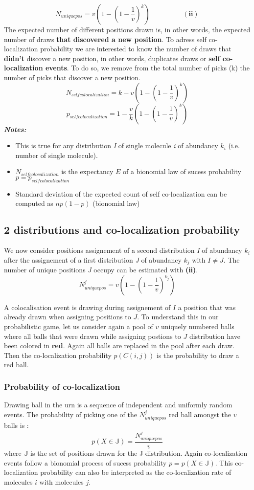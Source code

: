 \documentclass{article}  %
\begin{document}
\[
    N_{uniquepos} = v(1-(1-\frac{1}{v})^k) \hspace{2cm} (\textbf{ii})
\]
The expected number of different positions drawn is, in other words, the expected number of draws \textbf{that discovered a new position}.
To adress self co-localization probability we are interested to know the number of draws that \textbf{didn't} discover a new position,
in other words, duplicates draws or \textbf{self co-localization events}. To do so, we remove from the total number of picks (k) the
number of picks that discover a new position.
\[
N_{self colocalization} = k - v(1-(1-\frac{1}{v})^k)
\]
\[
p_{self colocalization} = 1 - \frac{v}{k}(1-(1-\frac{1}{v})^k)
\]
\textit{\textbf{Notes:}}
\begin{itemize}
    \item This is true for any distribution \textit{I} of single molecule \textit{i} of abundancy $ k_i $ (i.e. number of single molecule).
    \item $ N_{selfcolocalization} $ is the expectancy $E$ of a bionomial law of sucess probability $p = p_{selfcolocalization}$ 
    \item Standard deviation of the expected count of self co-localization can be computed as $ np(1-p) $ (bionomial law)
\end{itemize}


\subsection{2 distributions and co-localization probability}
We now consider positions assignement of a second distribution \textit{I} of abundancy $ k_i $ after the assignement of a first 
distribution \textit{J} of abundancy $ k_j $ with $ I \neq J $. The number of unique positions \textit{J} occupy can be estimated with
\textbf{(ii)}.
\[
N^j_{uniquepos} = v(1-(1-\frac{1}{v})^{k_j})
\]

A colocalisation event is drawing during assignement of $I$ a position that was already drawn when assigning positions to $J$. To
understand this in our probabilistic game, let us consider again a pool of $v$ uniquely numbered balls where all balls that were 
drawn while assigning postions to $J$ distribution have been colored in \textbf{red}. Again all balls are replaced in the pool after
each draw. Then the co-localization probability $p(C(i,j))$ is the
probability to draw a red ball.

\subsubsection{Probability of co-localization}
Drawing ball in the urn is a sequence of independent and uniformly random events. The probability of picking one of the $N^j_{uniquepos}$ red ball amongst the $v$
balls is :
\[
p(X\in \mathbb{J}) = \frac{N^j_{uniquepos}}{v}
\] 
where $\mathbb{J}$  is the set of positions drawn for the J distribution.
Again co-localization events follow a bionomial process of sucess probability $p = p(X\in \mathbb{J})$. This co-localization probability
can also be interpreted as the co-localization rate of molecules $i$ with molecules $j$.
\end{document}

